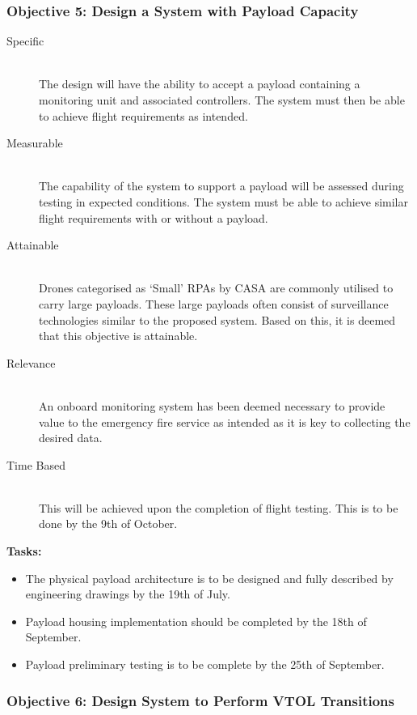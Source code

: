 \begin{appendices}
\subsubsection{Objective 5: Design a System with Payload Capacity}

\begin{description}
    \item[Specific] \hfill \\
    The design will have the ability to accept a payload containing a monitoring unit and associated controllers. The system must then be able to achieve flight requirements as intended.
    \item[Measurable] \hfill \\
    The capability of the system to support a payload will be assessed during testing in expected conditions. The system must be able to achieve similar flight requirements with or without a payload.
    \item[Attainable] \hfill \\
    Drones categorised as `Small' RPAs by CASA are commonly utilised to carry large payloads. These large payloads often consist of surveillance technologies similar to the proposed system. Based on this, it is deemed that this objective is attainable.
    \item[Relevance] \hfill \\
    An onboard monitoring system has been deemed necessary to provide value to the emergency fire service as intended as it is key to collecting the desired data.
    \item[Time Based] \hfill \\
    This will be achieved upon the completion of flight testing. This is to be done by the 9th of October.
\end{description}

\textbf{Tasks:}
\begin{itemize}
    \item The physical payload architecture is to be designed and fully described by engineering drawings by the 19th of July.
    \item Payload housing implementation should be completed by the 18th of September.
    \item Payload preliminary testing is to be complete by the 25th of September.
\end{itemize}

\subsubsection{Objective 6: Design System to Perform VTOL Transitions}


\end{appendices}
